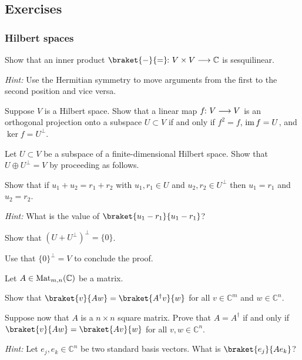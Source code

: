 \documentclass[a4paper, oneside, 12pt]{amsart}
\begin{document}
\cleardoublepage
\subsection{Exercises}\label{sec:basics-exercises}

\subsubsection*{Hilbert spaces}

\begin{exercise}\label{exe:inner-product-is-sesquilinear}
  Show that an inner product \(\braket{\blank}{\bblank} \from V\times V \to \mathbb{C}\) is sesquilinear.

  \textit{Hint:} Use the Hermitian symmetry to move arguments from the first to the second position and vice versa.
\end{exercise}

\begin{exercise}\label{exe:alternative-defn-orthogonal-projection}
  Suppose \(V\) is a Hilbert space.
  Show that a linear map \(f \from V\to V\) is an orthogonal projection onto a subspace \(U \subset V\) if and only if \(f^{2} = f\), \(\operatorname{im} f = U\), and \(\ker f = U^{\perp}\).
\end{exercise}

\begin{exercise}\label{exe:orth-complement-direct-sum}
  Let \(U\subset V\) be a subspace of a finite-dimensional Hilbert space.
  Show that \(U\oplus U^{\perp} = V\) by proceeding as follows.
  \begin{thmlist}
    \item Show that if \(u_{1} + u_{2} = r_{1} + r_{2} \) with \(u_{1}, r_{1} \in U\) and \(u_{2}, r_{2} \in U^{\perp}\) then \(u_{1} = r_{1}\) and \(u_{2} = r_{2}\).

    \textit{Hint:} What is the value of \(\braket{u_{1}-r_{1}}{u_{1} -r_{1}}\)?
    \item Show that \((U+ U^{\perp})^{\perp} =\{0\}\).
    \item Use that \(\{0\}^{\perp} = V\) to conclude the proof.
  \end{thmlist}
\end{exercise}

\begin{exercise}\label{exe:char-of-self-adjoint}
  Let  \(A \in \operatorname{Mat}_{m,n} ( \mathbb{C})\) be a matrix.
  \begin{thmlist}
    \item Show that \(\braket{v}{Aw} = \braket{A^{\dagger} v}{w}\) for all \(v\in \mathbb{C}^{m}\) and \(w \in \mathbb{C}^{n}\).
    \item Suppose now that \(A\) is a \(n\times n\) square matrix.
    Prove that \(A= A^{\dagger}\) if and only if \(\braket{v}{Aw} = \braket{Av}{w}\) for all \( v,w \in \mathbb{C}^{n}\).

    \textit{Hint:} Let \(e_{j}, e_{k}\in \mathbb{C}^{n}\) be two standard basis vectors.
    What is \(\braket{e_{j}}{A e_{k}}\)?
  \end{thmlist}
\end{exercise}
\end{document}
